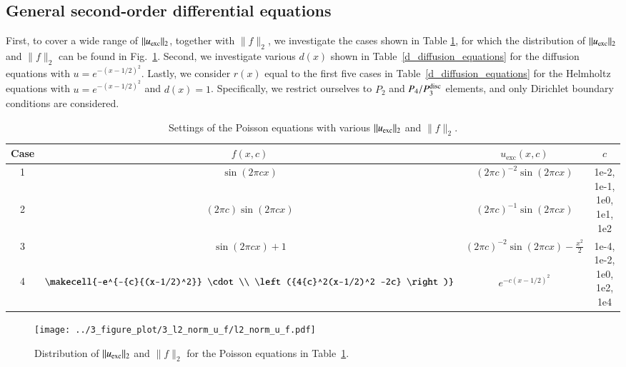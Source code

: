\documentclass[review,3p]{elsarticle}
\begin{document}
\subsection{General second-order differential equations}	    \label{section_scaling}

First, to cover a wide range of $\|u_{\rm exc}\|_2$, together with $\|f\|_2$, we investigate the cases shown in Table \ref{scaling_cases_Poisson}, for which the distribution of $\|u_{\rm exc}\|_2$ and $\|f\|_2$ can be found in Fig.~\ref{l2_norm_u_f}. Second, we investigate various $d(x)$ shown in Table~\ref{d_diffusion_equations} for the diffusion equations with $u=e^{-{(x-1/2)^2}}$. Lastly, we consider $r(x)$ equal to the first five cases in Table~\ref{d_diffusion_equations} for the Helmholtz equations with $u=e^{-{(x-1/2)^2}}$ and $d(x)=1$. Specifically, we restrict ourselves to $P_2$ and $P_4/P_3^{\rm disc}$ elements, and only Dirichlet boundary conditions are considered. 

\begin{table}[!ht]
\centering
\caption [w]{Settings of the Poisson equations with various $\|u_{\rm exc}\|_2$ and $\|f\|_2$.} 
\label{scaling_cases_Poisson}
 \begin{tabular}{c c c c} \hline      
Case & $f(x,c)$ & $u_{\text{exc}}(x,c)$ & $c$ \\ \hline
1 & $\sin (2 \pi cx)$ & ${(2 \pi c)}^{-2} \sin (2 \pi cx)$ & \multirow{2}{*}{1e-2, 1e-1, 1e0, 1e1, 1e2} \\ \cline{1-3}
2 & $(2 \pi c) \sin (2 \pi c x)$ & ${(2 \pi c)}^{-1} \sin (2 \pi cx)$ &  \\ \hline
3 & $\sin (2 \pi c x) +1$ & ${(2 \pi c)}^{-2}\sin (2 \pi c x)-\frac{x^2}{2}$ & \multirow{2}{*}{1e-4, 1e-2, 1e0, 1e2, 1e4} \\ \cline{1-3}
4 & $\makecell{-e^{-{c}{(x-1/2)^2}} \cdot \\ \left({4{c}^2(x-1/2)^2 -2c} \right)}$ & $e^{-{c}{{(x-1/2)^2}}}$ &  \\ \hline
\end{tabular}
\end{table}

\begin{figure}[!ht]
\centering
    \texttt{[image: ../3\_figure\_plot/3\_l2\_norm\_u\_f/l2\_norm\_u\_f.pdf]}
    \caption{Distribution of $\|u_{\rm exc}\|_2$ and $\|f\|_2$ for the Poisson equations in Table~\ref{scaling_cases_Poisson}.}
    \label{l2_norm_u_f}
\end{figure}
\end{document}
